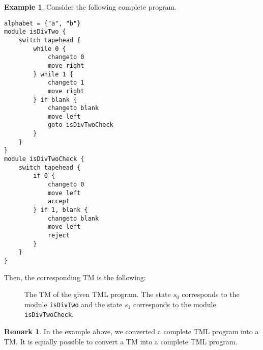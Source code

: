 \documentclass{amsart}
\theoremstyle{definition}
\newtheorem{remark}[theorem]{Remark}
\newtheorem{example}[theorem]{Example}
\begin{document}
    \begin{example}
        Consider the following complete program.
\begin{lstlisting}[language=TML]
alphabet = {"a", "b"}
module isDivTwo {
    switch tapehead {
        while 0 {
            changeto 0
            move right
        } while 1 {
            changeto 1
            move right
        } if blank {
            changeto blank
            move left
            goto isDivTwoCheck
        }
    }
}
module isDivTwoCheck {
    switch tapehead {
        if 0 {
            changeto 0
            move left
            accept
        } if 1, blank {
            changeto blank
            move left
            reject
        }
    }
}
\end{lstlisting}
    Then, the corresponding TM is the following:
    \begin{figure}[H]
        \centering
        \caption{The TM of the given TML program. The state $s_0$ corresponds to the module \texttt{isDivTwo} and the state $s_1$ corresponds to the module \texttt{isDivTwoCheck}.}
    \end{figure}
    \end{example}
    
    \begin{remark}
        In the example above, we converted a complete TML program into a TM. It is equally possible to convert a TM into a complete TML program.
    \end{remark}
\end{document}
